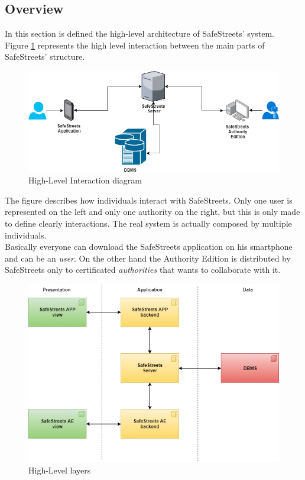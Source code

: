 \documentclass{article}
\begin{document}
		\subsection{Overview}
		In this section is defined the high-level architecture of SafeStreets' system. \\ 
		Figure \ref{fig:hinteraction_diagram} represents the high level interaction between the main parts of SafeStreets' structure.
		\begin{figure}[H]
			\includegraphics [scale=0.5] {diagrams/high-interaction.png}
			\caption[High-Level Interaction]{High-Level Interaction diagram}
			\label{fig:hinteraction_diagram}
		\end{figure}
		The figure describes how individuals interact with SafeStreets. Only one user is represented on the left and only one authority on the right, but this is only made to define clearly interactions. The real system is actually composed by multiple individuals.\\
		Basically everyone can download the SafeStreets application on his smartphone and can be an \textit{user}. On the other hand the Authority Edition is distributed by SafeStreets only to certificated \textit{authorities} that wants to collaborate with it. 
		\begin{figure}[H]
			\includegraphics [scale=0.5] {diagrams/system_overview.png}
			\caption[High-Level Layers]{High-Level layers}
			\label{fig:hlayers}
		\end{figure}
\end{document}
